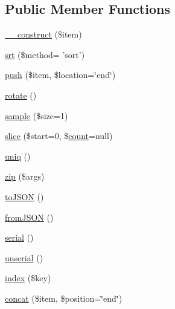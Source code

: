 \subsection*{Public Member Functions}
\begin{DoxyCompactItemize}
\item 
\hyperlink{class_pierce_moore_1_1_ruby_p_h_p_1_1r_array_a4b0c1fe0e6c94ec2df5006f414b164c4}{\-\_\-\-\_\-construct} (\$item)
\item 
\hyperlink{class_pierce_moore_1_1_ruby_p_h_p_1_1r_array_a977f683ea39406f1243565b0ee28bd5a}{srt} (\$method= 'sort')
\item 
\hyperlink{class_pierce_moore_1_1_ruby_p_h_p_1_1r_array_a24a0a2d08214aa208efaf13be12b41fe}{push} (\$item, \$location=\char`\"{}end\char`\"{})
\item 
\hyperlink{class_pierce_moore_1_1_ruby_p_h_p_1_1r_array_a74e94d71195d9cbb9c9e3bca3353d912}{rotate} ()
\item 
\hyperlink{class_pierce_moore_1_1_ruby_p_h_p_1_1r_array_ace98c3b631ca27cdb027bbe389ef8628}{sample} (\$size=1)
\item 
\hyperlink{class_pierce_moore_1_1_ruby_p_h_p_1_1r_array_ae01473d9a4d7f2c33c1a157b9cce13f4}{slice} (\$start=0, \$\hyperlink{class_pierce_moore_1_1_ruby_p_h_p_1_1r_af7fc0f34bd91e802322d34f8942c3eee}{count}=null)
\item 
\hyperlink{class_pierce_moore_1_1_ruby_p_h_p_1_1r_array_a032c9d1b1b6ac32627b95225479aa7c0}{uniq} ()
\item 
\hyperlink{class_pierce_moore_1_1_ruby_p_h_p_1_1r_array_a2dba4fd3850e2c373dad4604d170dfa6}{zip} (\$args)
\item 
\hyperlink{class_pierce_moore_1_1_ruby_p_h_p_1_1r_array_a2108d0f07e9bca6160bf5885703de972}{to\-J\-S\-O\-N} ()
\item 
\hyperlink{class_pierce_moore_1_1_ruby_p_h_p_1_1r_array_ae456068dd57aa56c7fc891a526e67c32}{from\-J\-S\-O\-N} ()
\item 
\hyperlink{class_pierce_moore_1_1_ruby_p_h_p_1_1r_array_a20d848af138f92c4604f0bcecce267e2}{serial} ()
\item 
\hyperlink{class_pierce_moore_1_1_ruby_p_h_p_1_1r_array_a5664dc3d9f1d71ac463a833d37583e84}{unserial} ()
\item 
\hyperlink{class_pierce_moore_1_1_ruby_p_h_p_1_1r_array_ada723c8fc4c1599c3f0a5a73698ef7fd}{index} (\$key)
\item 
\hyperlink{class_pierce_moore_1_1_ruby_p_h_p_1_1r_array_a69c3762d52c367c08ca4dd234f5576df}{concat} (\$item, \$position=\char`\"{}end\char`\"{})

\end{DoxyCompactItemize}
